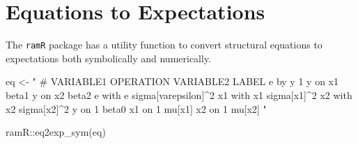 \documentclass[
]{book}
\newenvironment{Shaded}{\begin{snugshade}}{\end{snugshade}}
\newcommand{\FunctionTok}[1]{\textcolor[rgb]{0.00,0.00,0.00}{#1}}
\newcommand{\NormalTok}[1]{#1}
\newcommand{\OtherTok}[1]{\textcolor[rgb]{0.56,0.35,0.01}{#1}}
\newcommand{\SpecialCharTok}[1]{\textcolor[rgb]{0.00,0.00,0.00}{#1}}
\newcommand{\StringTok}[1]{\textcolor[rgb]{0.31,0.60,0.02}{#1}}
\theoremstyle{definition}
\theoremstyle{definition}
\theoremstyle{definition}
\theoremstyle{remark}
\begin{document}
\hypertarget{equations-to-expectations-1}{%
\section{Equations to Expectations}\label{equations-to-expectations-1}}

The \texttt{ramR} package has a utility function
to convert structural equations to expectations
both symbolically and numerically.

\begin{Shaded}
\begin{Highlighting}[]
\NormalTok{eq }\OtherTok{\textless{}{-}} \StringTok{"}
\StringTok{  \# VARIABLE1 OPERATION VARIABLE2 LABEL}
\StringTok{  e           by        y         1}
\StringTok{  y           on        x1        beta1}
\StringTok{  y           on        x2        beta2}
\StringTok{  e           with      e         sigma[varepsilon]\^{}2}
\StringTok{  x1          with      x1        sigma[x1]\^{}2}
\StringTok{  x2          with      x2        sigma[x2]\^{}2}
\StringTok{  y           on        1         beta0}
\StringTok{  x1          on        1         mu[x1]}
\StringTok{  x2          on        1         mu[x2]}
\StringTok{"}
\end{Highlighting}
\end{Shaded}

\begin{Shaded}
\begin{Highlighting}[]
\NormalTok{ramR}\SpecialCharTok{::}\FunctionTok{eq2exp\_sym}\NormalTok{(eq)}
\end{Highlighting}
\end{Shaded}
\end{document}
